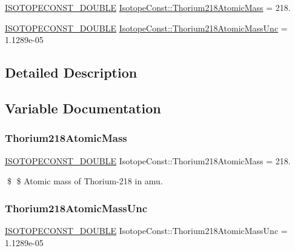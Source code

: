 \begin{DoxyCompactItemize}
\item 
\mbox{\hyperlink{group___isotope_const-_macros_ga8f45a7272ce02c0b4c65c44636ed719a}{I\+S\+O\+T\+O\+P\+E\+C\+O\+N\+S\+T\+\_\+\+D\+O\+U\+B\+LE}} \mbox{\hyperlink{group___isotope_const-_thorium-_th218_gaea97fa9dbcd63ddee805d353065c0f5d}{Isotope\+Const\+::\+Thorium218\+Atomic\+Mass}} = 218.
\item 
\mbox{\hyperlink{group___isotope_const-_macros_ga8f45a7272ce02c0b4c65c44636ed719a}{I\+S\+O\+T\+O\+P\+E\+C\+O\+N\+S\+T\+\_\+\+D\+O\+U\+B\+LE}} \mbox{\hyperlink{group___isotope_const-_thorium-_th218_ga189f7c16e6fce1df8234d5c3d084a30a}{Isotope\+Const\+::\+Thorium218\+Atomic\+Mass\+Unc}} = 1.\+1289e-\/05
\end{DoxyCompactItemize}


\subsection{Detailed Description}


\subsection{Variable Documentation}
\mbox{\label{group___isotope_const-_thorium-_th218_gaea97fa9dbcd63ddee805d353065c0f5d}} 
\subsubsection{\texorpdfstring{Thorium218\+Atomic\+Mass}{Thorium218AtomicMass}}
{\footnotesize\ttfamily \mbox{\hyperlink{group___isotope_const-_macros_ga8f45a7272ce02c0b4c65c44636ed719a}{I\+S\+O\+T\+O\+P\+E\+C\+O\+N\+S\+T\+\_\+\+D\+O\+U\+B\+LE}} Isotope\+Const\+::\+Thorium218\+Atomic\+Mass = 218.}

\$ \$ Atomic mass of Thorium-\/218 in amu. \mbox{\label{group___isotope_const-_thorium-_th218_ga189f7c16e6fce1df8234d5c3d084a30a}} 
\subsubsection{\texorpdfstring{Thorium218\+Atomic\+Mass\+Unc}{Thorium218AtomicMassUnc}}
{\footnotesize\ttfamily \mbox{\hyperlink{group___isotope_const-_macros_ga8f45a7272ce02c0b4c65c44636ed719a}{I\+S\+O\+T\+O\+P\+E\+C\+O\+N\+S\+T\+\_\+\+D\+O\+U\+B\+LE}} Isotope\+Const\+::\+Thorium218\+Atomic\+Mass\+Unc = 1.\+1289e-\/05}

